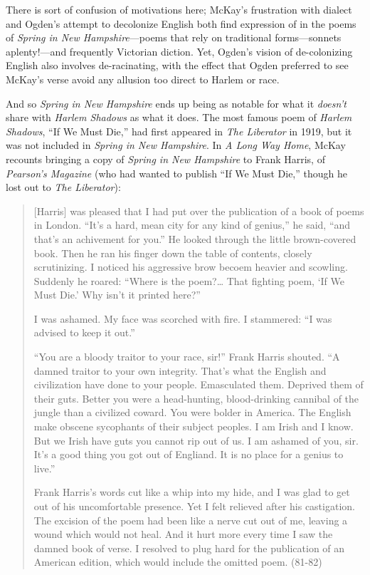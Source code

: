 \documentclass[
  12pt,
]{article}
\begin{document}
There is sort of confusion of motivations here; McKay's frustration with
dialect and Ogden's attempt to decolonize English both find expression
of in the poems of \emph{Spring in New Hampshire}---poems that rely on
traditional forms---sonnets aplenty!---and frequently Victorian diction.
Yet, Ogden's vision of de-colonizing English also involves
de-racinating, with the effect that Ogden preferred to see McKay's verse
avoid any allusion too direct to Harlem or race.

And so \emph{Spring in New Hampshire} ends up being as notable for what
it \emph{doesn't} share with \emph{Harlem Shadows} as what it does. The
most famous poem of \emph{Harlem Shadows}, ``If We Must Die,'' had first
appeared in \emph{The Liberator} in 1919, but it was not included in
\emph{Spring in New Hampshire}. In \emph{A Long Way Home}, McKay
recounts bringing a copy of \emph{Spring in New Hampshire} to Frank
Harris, of \emph{Pearson's Magazine} (who had wanted to publish ``If We
Must Die,'' though he lost out to \emph{The Liberator}):

\begin{quote}
{[}Harris{]} was pleased that I had put over the publication of a book
of poems in London. ``It's a hard, mean city for any kind of genius,''
he said, ``and that's an achivement for you.'' He looked through the
little brown-covered book. Then he ran his finger down the table of
contents, closely scrutinizing. I noticed his aggressive brow becoem
heavier and scowling. Suddenly he roared: ``Where is the poem?\ldots{}
That fighting poem, `If We Must Die.' Why isn't it printed here?''

I was ashamed. My face was scorched with fire. I stammered: ``I was
advised to keep it out.''

``You are a bloody traitor to your race, sir!'' Frank Harris shouted.
``A damned traitor to your own integrity. That's what the English and
civilization have done to your people. Emasculated them. Deprived them
of their guts. Better you were a head-hunting, blood-drinking cannibal
of the jungle than a civilized coward. You were bolder in America. The
English make obscene sycophants of their subject peoples. I am Irish and
I know. But we Irish have guts you cannot rip out of us. I am ashamed of
you, sir. It's a good thing you got out of Engliand. It is no place for
a genius to live.''

Frank Harris's words cut like a whip into my hide, and I was glad to get
out of his uncomfortable presence. Yet I felt relieved after his
castigation. The excision of the poem had been like a nerve cut out of
me, leaving a wound which would not heal. And it hurt more every time I
saw the damned book of verse. I resolved to plug hard for the
publication of an American edition, which would include the omitted
poem. (81-82)
\end{quote}
\end{document}
